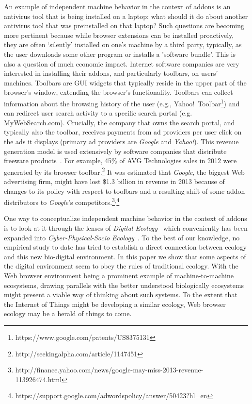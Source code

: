 \documentclass[10pt,letterpaper]{article}
\begin{document}
An example of independent machine behavior in the context of addons is an antivirus tool that is being installed on a laptop: what should it do about another antivirus tool that was preinstalled on that laptop? Such questions are becoming more pertinent because while browser extensions can be installed proactively, they are often `silently' installed on one's machine by a third party, typically, as the user downloads some other program or installs a 'software bundle'. This is also a question of much economic impact. Internet software companies are very interested in installing their addons, and particularly toolbars, on users' machines. Toolbars are GUI widgets that typically reside in the upper part of the browser's window, extending the browser's functionality. Toolbars can collect information about the browsing history of the user (e.g., Yahoo!~Toolbar\footnote{ https://www.google.com/patents/US8375131}) and can redirect user search activity to a specific search portal (e.g. MyWebSearch.com). Crucially, the company that owns the search portal, and typically also the toolbar, receives payments from ad providers per user click on the ads it displays (primary ad providers are \textit{Google} and \textit{Yahoo!}). This revenue generation model is used extensively by software companies that distribute freeware products~\cite{leontiadis2012don}. For example, 45\% of AVG Technologies sales in 2012 were generated by its browser toolbar.\footnote{ http://seekingalpha.com/article/1147451} It was estimated that \textit{Google}, the biggest Web advertising firm, might have lost \$1.3 billion in revenue in 2013 because of changes to its policy with respect to toolbars and a resulting shift of some addon distributors to \textit{Google}'s competitors.\footnote{ http://finance.yahoo.com/news/google-may-miss-2013-revenue-113926474.html}$^{,}$\footnote{ https://support.google.com/adwordspolicy/answer/50423?hl=en}

One way to conceptualize independent machine behavior in the context of addons is to look at it through the lenses of \textit{Digital Ecology}~\cite{kleineberg2015digital} which conveniently has been expanded into \textit{Cyber-Physical-Socio Ecology}~\cite{shi2011cyber}. To the best of our knowledge, no empirical study to date has tried to establish a direct connection between ecology and this new bio-digital environment. In this paper we show that some aspects of the digital environment seem to obey the rules of traditional ecology. With the Web browser environment being a prominent example of machine-to-machine ecosystems, drawing parallels with the better understood biologically ecosystems might present a viable way of thinking about such systems. To the extent that the Internet of Things might be developing a similar ecology, Web browser ecology may be a herald of things to come.  
\end{document}
